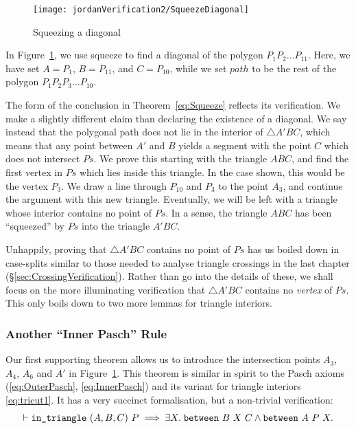 \begin{figure}
\centering\texttt{[image: jordanVerification2/SqueezeDiagonal]}
\caption{Squeezing a diagonal}
\label{fig:SqueezeDiagonal}
\end{figure}

In Figure~\ref{fig:SqueezeDiagonal}, we use squeeze to find a diagonal of the polygon $P_1P_2\ldots P_{11}$. Here, we have set $A = P_1$, $B = P_{11}$, and $C = P_{10}$, while we set $path$ to be the rest of the polygon $P_1P_2P_3\ldots P_{10}$. 

The form of the conclusion in Theorem~\ref{eq:Squeeze} reflects its verification. We make a slightly different claim than declaring the existence of a diagonal. We say instead that the polygonal path does not lie in the interior of $\triangle A'BC$, which means that any point between $A'$ and $B$ yields a segment with the point $C$ which does not intersect $Ps$. We prove this starting with the triangle $ABC$, and find the first vertex in $Ps$ which lies inside this triangle. In the case shown, this would be the vertex $P_3$. We draw a line through $P_{10}$ and $P_3$ to the point $A_3$, and continue the argument with this new triangle. Eventually, we will be left with a triangle whose interior contains no point of $Ps$. In a sense, the triangle $ABC$ has been ``squeezed'' by $Ps$ into the triangle $A'BC$.

Unhappily, proving that $\triangle A'BC$ contains no point of $Ps$ has us boiled down in case-splits similar to those needed to analyse triangle crossings in the last chapter (\S\ref{sec:CrossingVerification}). Rather than go into the details of these, we shall focus on the more illuminating verification that $\triangle A'BC$ contains no \emph{vertex} of $Ps$. This only boils down to two more lemmas for triangle interiors.

\subsubsection{Another ``Inner Pasch'' Rule}
Our first supporting theorem allows us to introduce the intersection points $A_3$, $A_4$, $A_6$ and $A'$ in Figure~\ref{fig:SqueezeDiagonal}. This theorem is similar in spirit to the Pasch axioms (\ref{eq:OuterPasch}, \ref{eq:InnerPasch}) and its variant for triangle interiors \eqref{eq:tricut1}. It has a very succinct formalisation, but a non-trivial verification:
\begin{equation}\label{eq:TriCut3}
\vdash\texttt{in\_triangle}\ (A,B,C)\ P \implies \exists X.\; \texttt{between}\ B\ X\ C \wedge \texttt{between}\ A\ P\ X.
\end{equation}

